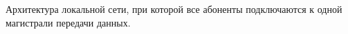 Архитектура локальной сети, при которой все абоненты
подключаются к одной магистрали передачи данных.